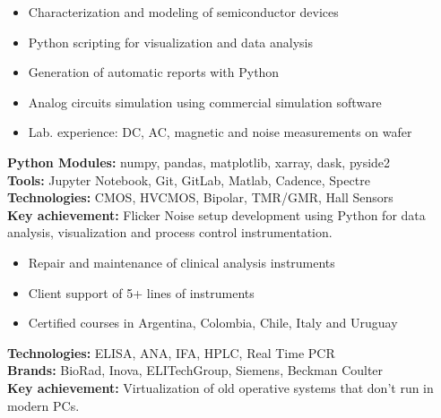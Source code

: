 \documentclass[10pt,a4paper]{altacv}
\begin{document}
\medskip
{}
\nocite{*}
\justifying
{}
\medskip
\begin{itemize}
    \item Characterization and modeling of semiconductor devices
    \item Python scripting for visualization and data analysis
    \item Generation of automatic reports with Python
    \item Analog circuits simulation using commercial simulation software
    \item Lab. experience: DC, AC, magnetic and noise measurements on wafer
\end{itemize}
\medskip
\small{
\textbf{Python Modules:} numpy, pandas, matplotlib, xarray, dask, pyside2 \\
\textbf{Tools:} Jupyter Notebook, Git, GitLab, Matlab, Cadence, Spectre \\
\textbf{Technologies:} CMOS, HVCMOS, Bipolar, TMR/GMR, Hall Sensors \\
\textbf{Key achievement:} Flicker Noise setup development using Python for data analysis, visualization and process control instrumentation.
}

\medskip

\divider

\medskip
\begin{itemize}
    \item Repair and maintenance of clinical analysis instruments
    \item Client support of 5+ lines of instruments
    \item Certified courses in Argentina, Colombia, Chile, Italy and Uruguay
\end{itemize}
\medskip
\small{
\textbf{Technologies:} ELISA, ANA, IFA, HPLC, Real Time PCR \\
\textbf{Brands:} BioRad, Inova, ELITechGroup, Siemens, Beckman Coulter \\
\textbf{Key achievement:} Virtualization of old operative systems that don’t run in modern PCs. \\
}
\end{document}
